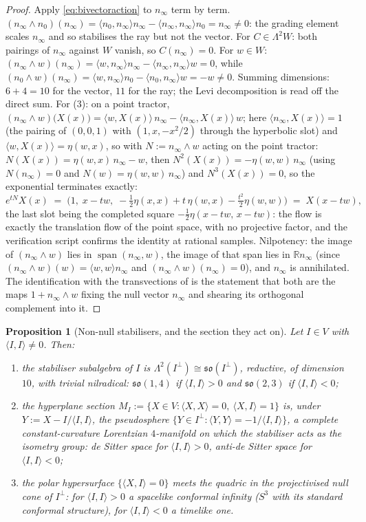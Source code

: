 \documentclass[11pt]{article}
\newtheorem{proposition}[theorem]{Proposition}
\theoremstyle{definition}
\newcommand{\R}{\mathbb{R}}
\newcommand{\nO}{n_0}
\newcommand{\nInf}{n_\infty}
\newcommand{\ip}[2]{\langle #1, #2\rangle}
\begin{document}
\begin{proof}
Apply \eqref{eq:bivectoraction} to $\nInf$ term by term. $(\nInf \wedge \nO)(\nInf) = \ip{\nO}{\nInf}\nInf - \ip{\nInf}{\nInf}\nO = \nInf \neq 0$: the grading element scales $\nInf$ and so stabilises the ray but not the vector. For $C \in \Lambda^2 W$: both pairings of $\nInf$ against $W$ vanish, so $C(\nInf) = 0$. For $w \in W$: $(\nInf \wedge w)(\nInf) = \ip{w}{\nInf}\nInf - \ip{\nInf}{\nInf}w = 0$, while $(\nO \wedge w)(\nInf) = \ip{w}{\nInf}\nO - \ip{\nO}{\nInf}w = -w \neq 0$. Summing dimensions: $6 + 4 = 10$ for the vector, $11$ for the ray; the Levi decomposition is read off the direct sum. For (3): on a point tractor, $(\nInf \wedge w)\bigl(X(x)\bigr) = \ip{w}{X(x)}\,\nInf - \ip{\nInf}{X(x)}\,w$; here $\ip{\nInf}{X(x)} = 1$ (the pairing of $(0,0,1)$ with $(1, x, -x^2/2)$ through the hyperbolic slot) and $\ip{w}{X(x)} = \eta(w, x)$, so with $N := \nInf \wedge w$ acting on the point tractor: $N(X(x)) = \eta(w, x)\,\nInf - w$, then $N^2(X(x)) = -\eta(w,w)\,\nInf$ (using $N(\nInf) = 0$ and $N(w) = \eta(w,w)\,\nInf$) and $N^3(X(x)) = 0$, so the exponential terminates exactly:
\[
e^{tN} X(x) \;=\; \bigl(1,\; x - tw,\; -\tfrac12\eta(x,x) + t\,\eta(w,x) - \tfrac{t^2}{2}\eta(w,w)\bigr) \;=\; X(x - tw),
\]
the last slot being the completed square $-\tfrac12\eta(x - tw,\, x - tw)$: the flow is exactly the translation flow of the point space, with no projective factor, and the verification script confirms the identity at rational samples. Nilpotency: the image of $(\nInf \wedge w)$ lies in $\operatorname{span}(\nInf, w)$, the image of that span lies in $\R \nInf$ (since $(\nInf\wedge w)(w) = \ip{w}{w}\nInf$ and $(\nInf\wedge w)(\nInf) = 0$), and $\nInf$ is annihilated. The identification with the transvections of \cite{ButlerT1} is the statement that both are the maps $1 + \nInf \wedge w$ fixing the null vector $\nInf$ and shearing its orthogonal complement into it.
\end{proof}

\begin{proposition}[Non-null stabilisers, and the section they act on]\label{prop:flatstabnn}
Let $I \in V$ with $\ip{I}{I} \neq 0$. Then:
\begin{enumerate}
\item the stabiliser subalgebra of $I$ is $\Lambda^2(I^\perp) \cong \mathfrak{so}(I^\perp)$, reductive, of dimension $10$, with trivial nilradical: $\mathfrak{so}(1,4)$ if $\ip{I}{I} > 0$ and $\mathfrak{so}(2,3)$ if $\ip{I}{I} < 0$;
\item the hyperplane section $M_I := \{X \in V : \ip{X}{X} = 0,\ \ip{X}{I} = 1\}$ is, under $Y := X - I/\ip{I}{I}$, the pseudosphere $\{Y \in I^\perp : \ip{Y}{Y} = -1/\ip{I}{I}\}$, a complete constant-curvature Lorentzian $4$-manifold on which the stabiliser acts as the isometry group: de Sitter space for $\ip{I}{I} > 0$, anti-de Sitter space for $\ip{I}{I} < 0$;
\item the polar hypersurface $\{\ip{X}{I} = 0\}$ meets the quadric in the projectivised null cone of $I^\perp$: for $\ip{I}{I} > 0$ a spacelike conformal infinity ($S^3$ with its standard conformal structure), for $\ip{I}{I} < 0$ a timelike one.
\end{enumerate}
\end{proposition}
\end{document}
